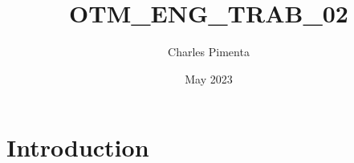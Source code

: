 \documentclass{article}
\title{OTM_ENG_TRAB_02}
\author{Charles Pimenta}
\date{May 2023}
\begin{document}
\maketitle

\section{Introduction}
\end{document}
